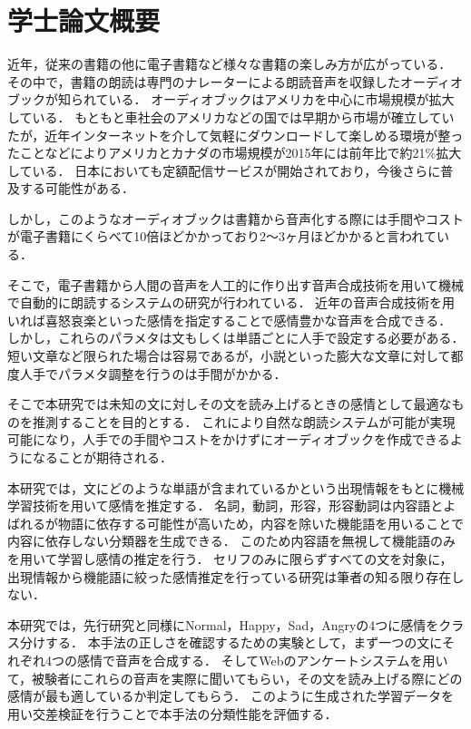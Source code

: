 \chapter*{学士論文概要}


近年，従来の書籍の他に電子書籍など様々な書籍の楽しみ方が広がっている．
その中で，書籍の朗読は専門のナレーターによる朗読音声を収録したオーディオブックが知られている．
オーディオブックはアメリカを中心に市場規模が拡大している．
もともと車社会のアメリカなどの国では早期から市場が確立していたが，近年インターネットを介して気軽にダウンロードして楽しめる環境が整ったことなどによりアメリカとカナダの市場規模が2015年には前年比で約21\%拡大している\cite{wsj}．
日本においても定額配信サービスが開始されており，今後さらに普及する可能性がある．

しかし，このようなオーディオブックは書籍から音声化する際には手間やコストが電子書籍にくらべて10倍ほどかかっており2〜3ヶ月ほどかかると言われている．\cite{ueda}

そこで，電子書籍から人間の音声を人工的に作り出す音声合成技術を用いて機械で自動的に朗読するシステムの研究が行われている．
近年の音声合成技術を用いれば喜怒哀楽といった感情を指定することで感情豊かな音声を合成できる．
しかし，これらのパラメタは文もしくは単語ごとに人手で設定する必要がある．
短い文章など限られた場合は容易であるが，小説といった膨大な文章に対して都度人手でパラメタ調整を行うのは手間がかかる．

そこで本研究では未知の文に対しその文を読み上げるときの感情として最適なものを推測することを目的とする．
これにより自然な朗読システムが可能が実現可能になり，人手での手間やコストをかけずにオーディオブックを作成できるようになることが期待される．

本研究では，文にどのような単語が含まれているかという出現情報をもとに機械学習技術を用いて感情を推定する．
名詞，動詞，形容，形容動詞は内容語とよばれるが物語に依存する可能性が高いため，内容を除いた機能語を用いることで内容に依存しない分類器を生成できる．
このため内容語を無視して機能語のみを用いて学習し感情の推定を行う．
セリフのみに限らずすべての文を対象に，出現情報から機能語に絞った感情推定を行っている研究は筆者の知る限り存在しない．

本研究では，先行研究と同様にNormal，Happy，Sad，Angryの4つに感情をクラス分けする．
本手法の正しさを確認するための実験として，まず一つの文にそれぞれ4つの感情で音声を合成する．
そしてWebのアンケートシステムを用いて，被験者にこれらの音声を実際に聞いてもらい，その文を読み上げる際にどの感情が最も適しているか判定してもらう．
このように生成された学習データを用い交差検証を行うことで本手法の分類性能を評価する．
